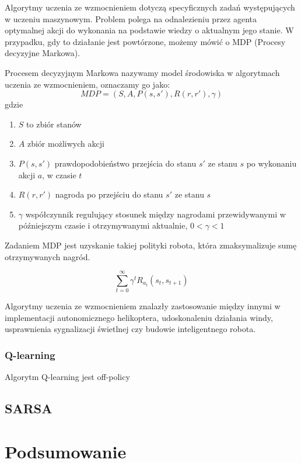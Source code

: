 Algorytmy uczenia ze wzmocnieniem dotyczą specyficznych zadań występujących w uczeniu maszynowym. Problem polega na 
odnalezieniu przez agenta optymalnej akcji do wykonania na podstawie wiedzy o aktualnym jego stanie. W przypadku, 
gdy to działanie jest powtórzone, możemy mówić o MDP (Procesy decyzyjne Markowa).

Procesem decyzyjnym Markowa nazywamy model środowiska w algorytmach uczenia ze wzmocnieniem, oznaczamy go jako:\\
$$MDP = (S, A, P(s, s'), R(r, r'), \gamma)$$
gdzie
\begin{enumerate}
 \item $S$ to zbiór stanów
 \item $A$ zbiór możliwych akcji
 \item $P(s, s')$ prawdopodobieństwo przejścia do stanu $s'$ ze stanu $s$ po wykonaniu akcji $a$, w czasie $t$
 \item $R(r, r')$ nagroda po przejściu do stanu $s'$ ze stanu $s$
 \item $\gamma$ współczynnik regulujący stosunek między nagrodami przewidywanymi w późniejszym czasie i 
otrzymywanymi aktualnie, $0 < \gamma < 1$
\end{enumerate}

Zadaniem MDP jest uzyskanie takiej polityki robota, która zmaksymalizuje sumę otrzymywanych nagród.

$$\sum\limits_{t=0}^\infty \gamma^{t} R_{a_{t}}(s_{t}, s_{t+1})$$

Algorytmy uczenia ze wzmocnieniem znalazły zastosowanie między innymi w implementacji autonomicznego 
helikoptera\cite{abbeel2007application}, udoskonaleniu działania windy\cite{barto1996improving}, usprawnienia 
sygnalizacji świetlnej\cite{wiering2000multi} czy budowie inteligentnego robota\cite{kimura2001reinforcement}.

\subsubsection{Q-learning}
\label{subsubsec:qlearning}

Algorytm Q-learning \cite{watkins1992q} jest off-policy
\subsection{SARSA}


\section{Podsumowanie}

